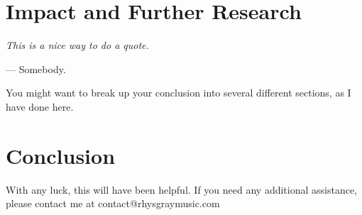\section{Impact and Further Research}
\emph{This is a nice way to do a quote.}
\begin{flushright}
    --- Somebody.\autocite[vii]{readCompendiumModernInstrumental1993}
\end{flushright}
You might want to break up your conclusion into several different sections, as I have done here.
\section{Conclusion}
With any luck, this will have been helpful. 
If you need any additional assistance, please contact me at contact@rhysgraymusic.com